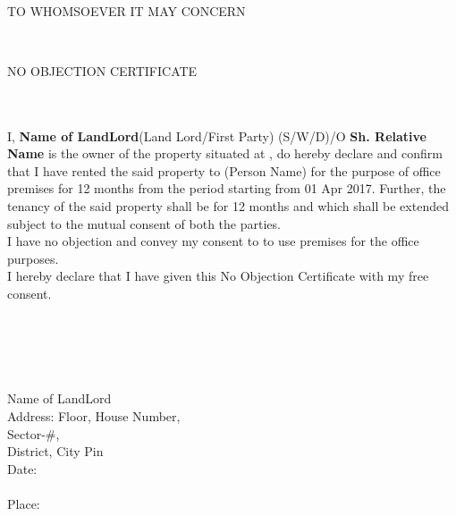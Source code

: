 \documentclass[a4paper,11pt] {report}
\begin{document}
\vspace*{2cm}\\
        {\bf \centerline{TO WHOMSOEVER IT MAY CONCERN}}
\vspace*{0.5cm}\\
        {\bf \centerline{NO OBJECTION CERTIFICATE}}
        \vspace*{0.5cm}
        \\
        \\ I, {\bf{Name of LandLord}}(Land Lord/First Party) (S/W/D)/O {\bf{Sh. Relative Name}} is the owner of the property situated at \underline{\myaddress}, do hereby declare and confirm that I have rented the said property to {\bf{\myname}}(Person Name) for the purpose of office premises for 12 months from the period starting from 01 Apr 2017. Further, the tenancy of the said property shall be for 12 months and which shall be extended subject to the mutual consent of both the parties.
        \\
I have no objection and convey my consent to {\bf{\myname}} to use premises for the office purposes.\\
I hereby declare that I have given this No Objection Certificate with my free consent.
\\
\\
\\
\\
\\
\\
Name of LandLord \\
Address: Floor, House Number, \\
Sector-#, \\
District, City Pin\\
Date: \DayAfter[0]\\
\\
Place: \myplace
\\
\end{document}

